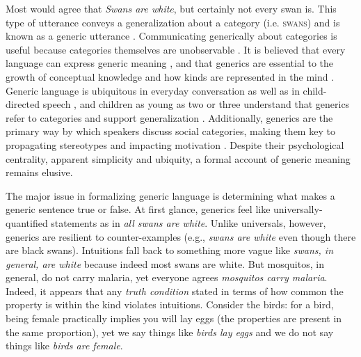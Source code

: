 \documentclass[12pt,letterpaper]{article}
\begin{document}
\newpage

Most would agree that \emph{Swans are white}, but certainly not every swan is.
This type of utterance conveys a generalization about a category (i.e. \textsc{swans}) and is known as a generic utterance \cite{Carlson1977,Leslie2008}.
Communicating generically about categories is useful because categories themselves are unobservable \cite{Markman1989}.
It is believed that every language can express generic meaning \cite{Behrens2005,Carlson1995}, and that generics are essential to the growth of conceptual knowledge \cite{Gelman2004} and how kinds are represented in the mind \cite{Leslie2008}.
Generic language is ubiquitous in everyday conversation as well as in child-directed speech \cite{Gelman2008}, and children as young as two or three understand that generics refer to categories and support generalization \cite{Cimpian2008}.
Additionally, generics are the primary way by which speakers discuss social categories, making them key to propagating stereotypes \cite{GelmanEtAl2004,Rhodes2012,Leslie2015} and impacting motivation \cite{Cimpian2010motivation}.
Despite their psychological centrality, apparent simplicity and ubiquity, a formal account of generic meaning remains elusive.

The major issue in formalizing generic language is determining what makes a generic sentence true or false.
At first glance, generics feel like universally-quantified statements as in \emph{all swans are white}. 
Unlike universals, however, generics are resilient to counter-examples (e.g., \emph{swans are white} even though there are black swans). 
Intuitions fall back to something more vague like \emph{swans, in general, are white} because indeed most swans are white.
But mosquitos, in general, do not carry malaria, yet everyone agrees \emph{mosquitos carry malaria}.
Indeed, it appears that any \emph{truth condition} stated in terms of how common the property is within the kind violates intuitions.
Consider the birds: for a bird, being female practically implies you will lay eggs (the properties are present in the same proportion), yet we say things like \emph{birds lay eggs} and we do not say things like \emph{birds are female}.
\end{document}
